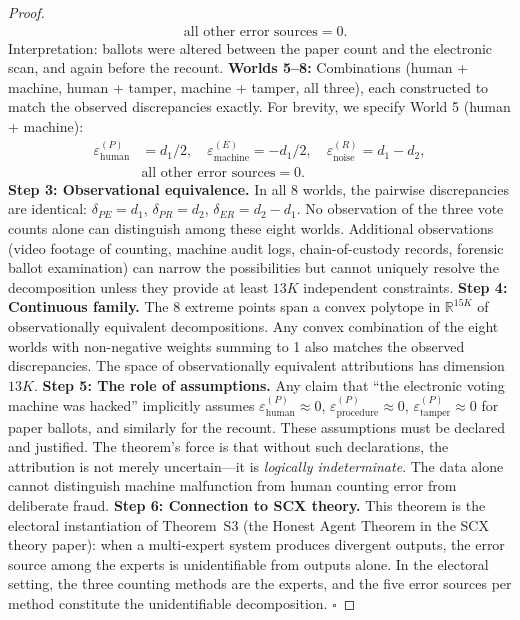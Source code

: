 \documentclass[11pt,a4paper]{article}
\theoremstyle{definition}
\newcommand{\R}{\mathbb{R}}
\newcommand{\ThmSCXHonest}{Theorem~S3}
\begin{document}
\begin{proof}
\begin{align}
    &\text{all other error sources} = 0.
\end{align}
Interpretation: ballots were altered between the paper count and the electronic scan, and again before the recount.
\textbf{Worlds 5--8:} Combinations (human + machine, human + tamper, machine + tamper, all three), each constructed to match the observed discrepancies exactly. For brevity, we specify World 5 (human + machine):
\begin{align}
    \varepsilon^{(P)}_{\text{human}} &= d_1/2, \quad \varepsilon^{(E)}_{\text{machine}} = -d_1/2, \quad \varepsilon^{(R)}_{\text{noise}} = d_1 - d_2, \\
    &\text{all other error sources} = 0.
\end{align}
\textbf{Step 3: Observational equivalence.} In all 8 worlds, the pairwise discrepancies are identical: $\delta_{PE} = d_1$, $\delta_{PR} = d_2$, $\delta_{ER} = d_2 - d_1$. No observation of the three vote counts alone can distinguish among these eight worlds. Additional observations (video footage of counting, machine audit logs, chain-of-custody records, forensic ballot examination) can narrow the possibilities but cannot uniquely resolve the decomposition unless they provide at least $13K$ independent constraints.
\textbf{Step 4: Continuous family.} The 8 extreme points span a convex polytope in $\R^{15K}$ of observationally equivalent decompositions. Any convex combination of the eight worlds with non-negative weights summing to 1 also matches the observed discrepancies. The space of observationally equivalent attributions has dimension $13K$.
\textbf{Step 5: The role of assumptions.} Any claim that ``the electronic voting machine was hacked'' implicitly assumes $\varepsilon^{(P)}_{\text{human}} \approx 0$, $\varepsilon^{(P)}_{\text{procedure}} \approx 0$, $\varepsilon^{(P)}_{\text{tamper}} \approx 0$ for paper ballots, and similarly for the recount. These assumptions must be declared and justified. The theorem's force is that without such declarations, the attribution is not merely uncertain---it is \textit{logically indeterminate}. The data alone cannot distinguish machine malfunction from human counting error from deliberate fraud.
\textbf{Step 6: Connection to SCX theory.} This theorem is the electoral instantiation of \ThmSCXHonest{} (the Honest Agent Theorem in the SCX theory paper): when a multi-expert system produces divergent outputs, the error source among the experts is unidentifiable from outputs alone. In the electoral setting, the three counting methods are the experts, and the five error sources per method constitute the unidentifiable decomposition. $\square$
\end{proof}
\end{document}
